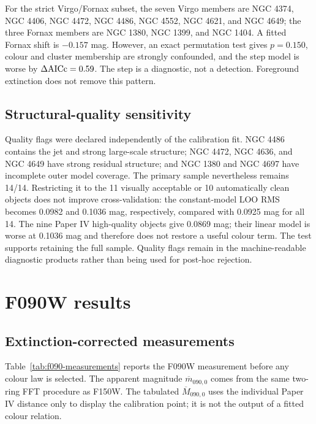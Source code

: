 \documentclass[nodoi,nocopyright]{pas}
\newcommand{\mbar}{\overline{m}}
\newcommand{\Mbar}{\overline{M}}
\begin{document}
For the strict Virgo/Fornax subset, the seven Virgo members are NGC 4374,
NGC 4406, NGC 4472, NGC 4486, NGC 4552, NGC 4621, and NGC 4649; the three
Fornax members are NGC 1380, NGC 1399, and NGC 1404. A fitted Fornax shift is
$-0.157$ mag. However, an exact permutation test gives $p=0.150$, colour and
cluster membership are strongly confounded, and the step model is worse by
$\Delta{\rm AICc}=0.59$. The step is a diagnostic, not a detection. Foreground
extinction does not remove this pattern.

\subsection{Structural-quality sensitivity}

Quality flags were declared independently of the calibration fit. NGC 4486
contains the jet and strong large-scale structure; NGC 4472, NGC 4636, and
NGC 4649 have strong residual structure; and NGC 1380 and NGC 4697 have
incomplete outer model coverage. The primary sample nevertheless remains
14/14. Restricting it to the 11 visually acceptable or 10 automatically clean
objects does not improve cross-validation: the constant-model LOO RMS becomes
0.0982 and 0.1036 mag, respectively, compared with 0.0925 mag for all 14.
The nine Paper IV high-quality objects give 0.0869 mag; their linear model is
worse at 0.1036 mag and therefore does not restore a useful colour term. The
test supports retaining the full sample. Quality flags remain in the
machine-readable diagnostic products rather than being used for post-hoc
rejection.

\section{F090W results}
\label{sec:f090-results}

\subsection{Extinction-corrected measurements}

Table~\ref{tab:f090-measurements} reports the F090W measurement before any
colour law is selected. The apparent magnitude $\mbar_{090,0}$ comes from the
same two-ring FFT procedure as F150W. The tabulated $\Mbar_{090,0}$ uses the
individual Paper IV distance only to display the calibration point; it is not
the output of a fitted colour relation.
\end{document}
